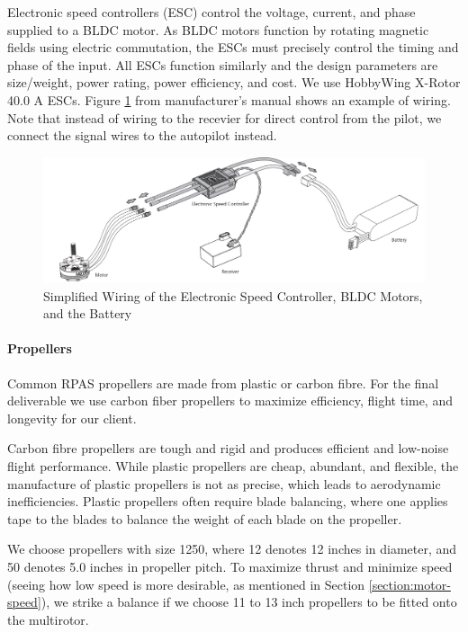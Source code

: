 Electronic speed controllers (ESC) control the voltage, current, and phase supplied to a BLDC motor. As BLDC motors function by rotating magnetic fields using electric commutation, the ESCs must precisely control the timing and phase of the input. All ESCs function similarly and the design parameters are size/weight, power rating, power efficiency, and cost. We use HobbyWing X-Rotor 40.0 A ESCs. Figure \ref{fig:esc} from manufacturer's manual\cite{xrotoresc} shows an example of wiring. Note that instead of wiring to the recevier for direct control from the pilot, we connect the signal wires to the autopilot instead.

\begin{figure}[H]
	\centering
	\includegraphics[width=\textwidth]{img/esc.png}
	\caption[Electronic speed controller]{Simplified Wiring of the Electronic Speed Controller, BLDC Motors, and the Battery}
	\label{fig:esc}
\end{figure}

\paragraph{Propellers}

Common RPAS propellers are made from plastic or carbon fibre. For the final deliverable we use carbon fiber propellers to maximize efficiency, flight time, and longevity for our client. 

Carbon fibre propellers are tough and rigid and produces efficient and low-noise flight performance\cite{cfvsp}.  While plastic propellers are cheap, abundant, and flexible, the manufacture of plastic propellers is not as precise, which leads to aerodynamic inefficiencies. Plastic propellers often require blade balancing, where one applies tape to the blades to balance the weight of each blade on the propeller. 

We choose propellers with size 1250, where 12 denotes 12 inches in diameter, and 50 denotes 5.0 inches in propeller pitch. To maximize thrust and minimize speed (seeing how low speed is more desirable, as mentioned in Section \ref{section:motor-speed}), we strike a balance if we choose 11 to 13 inch propellers to be fitted onto the multirotor.

